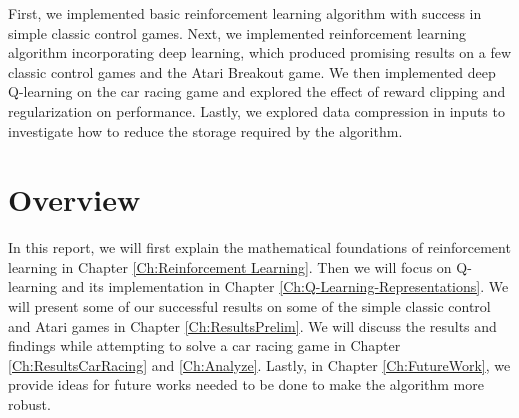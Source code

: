 First, we implemented basic reinforcement learning algorithm with success in simple classic control games. Next, we implemented reinforcement learning algorithm incorporating deep learning, which produced promising results on a few classic control games and the Atari Breakout game. We then implemented deep Q-learning on the car racing game and explored the effect of reward clipping and regularization on performance. Lastly, we explored data compression in inputs to investigate how to reduce the storage required by the algorithm.

\section{Overview}
In this report, we will first explain the mathematical foundations of reinforcement learning in Chapter \ref{Ch:Reinforcement Learning}. Then we will focus on Q-learning and its implementation in Chapter \ref{Ch:Q-Learning-Representations}. We will present some of our successful results on some of the simple classic control and Atari games in Chapter \ref{Ch:ResultsPrelim}. We will discuss the results and findings while attempting to solve a car racing game in Chapter \ref{Ch:ResultsCarRacing} and \ref{Ch:Analyze}. Lastly, in Chapter \ref{Ch:FutureWork}, we provide ideas for future works needed to be done to make the algorithm more robust.

\endinput

